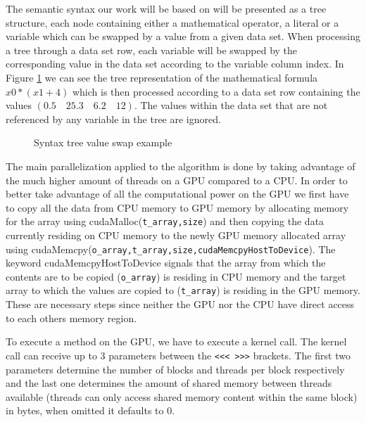 \documentclass[runningheads]{llncs}
\begin{document}
The semantic syntax our work will be based on will be presented as a tree structure, each node containing either a mathematical operator, a literal or a variable which can be swapped by a value from a given data set.
When processing a tree through a data set row, each variable will be swapped by the corresponding value in the data set according to the variable column index. In Figure \ref{syntree} we can see the tree representation of the mathematical formula $x0 * (x1+4)$ which is then processed according to a data set row containing the values $(0.5\quad 25.3\quad 6.2\quad 12)$. The values within the data set that are not referenced by any variable in the tree are ignored.
\begin{figure}

\hfil
{}
\hfil
\caption{Syntax tree value swap example}
\label{syntree}
\end{figure}


The main parallelization applied to the algorithm is done by taking advantage of the much higher amount of threads on a GPU compared to a CPU. In order to better take advantage of all the computational power on the GPU we first have to copy all the data from CPU memory to GPU memory by allocating memory for the array using cudaMalloc(\texttt{t\_array,size}) and then copying the data currently residing on CPU memory to the newly GPU memory allocated array using cudaMemcpy(\texttt{o\_array,t\_array,size,cudaMemcpyHostToDevice}). The keyword cudaMemcpyHostToDevice signals that the array from which the contents are to be copied (\texttt{o\_array}) is residing in CPU memory and the target array to which the values are copied to (\texttt{t\_array}) is residing in the GPU memory. These are necessary steps since neither the GPU nor the CPU have direct access to each others memory region.

To execute a method on the GPU, we have to execute a kernel call. The kernel call can receive up to 3 parameters between the \texttt{<<< >>>} brackets. The first two parameters determine the number of blocks and threads per block respectively and the last one determines the amount of shared memory between threads available (threads can only access shared memory content within the same block) in bytes, when omitted it defaults to 0.
\end{document}
